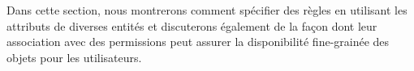 \label{sectionExemple}

Dans cette section, nous montrerons comment spécifier des règles en utilisant les attributs de diverses entités et discuterons également de la façon dont leur association avec des permissions peut assurer la disponibilité fine-grainée des objets pour les utilisateurs.

	
	
	
	
	
	
	
	
	
	
	
